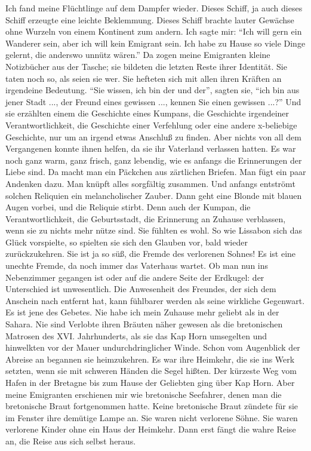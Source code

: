 \documentclass[12pt,ngerman,twocolumn]{article}
\begin{document}
Ich fand meine Flüchtlinge auf dem Dampfer wieder. Dieses Schiff, ja auch dieses Schiff erzeugte eine leichte Beklemmung. Dieses Schiff brachte lauter Gewächse ohne Wurzeln von einem Kontinent zum andern. Ich sagte mir: \enquote{Ich will gern ein Wanderer sein, aber ich will kein Emigrant sein. Ich habe zu Hause so viele Dinge gelernt, die anderswo unnütz wären.} Da zogen meine Emigranten kleine Notizbücher aus der Tasche; sie bildeten die letzten Reste ihrer Identität. Sie taten noch so, als seien sie wer. Sie hefteten sich mit allen ihren Kräften an irgendeine Bedeutung. \enquote{Sie wissen, ich bin der und der}, sagten sie, \enquote{ich bin aus jener Stadt ..., der Freund eines gewissen ..., kennen Sie einen gewissen ...?} Und sie erzählten einem die Geschichte eines Kumpans, die Geschichte irgendeiner Verantwortlichkeit, die Geschichte einer Verfehlung oder eine andere x-beliebige Geschichte, nur um an irgend etwas Anschluß zu finden. Aber nichts von all dem Vergangenen konnte ihnen helfen, da sie ihr Vaterland verlassen hatten. Es war noch ganz warm, ganz frisch, ganz lebendig, wie es anfangs die Erinnerungen der Liebe sind. Da macht man ein Päckchen aus zärtlichen Briefen. Man fügt ein paar Andenken dazu. Man knüpft alles sorgfältig zusammen. Und anfangs entströmt solchen Reliquien ein melancholischer Zauber. Dann geht eine Blonde mit blauen Augen vorbei, und die Reliquie stirbt. Denn auch der Kumpan, die Verantwortlichkeit, die Geburtsstadt, die Erinnerung an Zuhause verblassen, wenn sie zu nichts mehr nütze sind. Sie fühlten es wohl. So wie Lissabon sich das Glück vorspielte, so spielten sie sich den Glauben vor, bald wieder zurückzukehren. Sie ist ja so süß, die Fremde des verlorenen Sohnes! Es ist eine unechte Fremde, da noch immer das Vaterhaus wartet. Ob man nun ins Nebenzimmer gegangen ist oder auf die andere Seite der Erdkugel: der Unterschied ist unwesentlich. Die Anwesenheit des Freundes, der sich dem Anschein nach entfernt hat, kann fühlbarer werden als seine wirkliche Gegenwart. Es ist jene des Gebetes. Nie habe ich mein Zuhause mehr geliebt als in der Sahara. Nie sind Verlobte ihren Bräuten näher gewesen als die bretonischen Matrosen des XVI. Jahrhunderts, als sie das Kap Horn umsegelten und hinwelkten vor der Mauer undurchdringlicher Winde. Schon vom Augenblick der Abreise an begannen sie heimzukehren. Es war ihre Heimkehr, die sie ins Werk setzten, wenn sie mit schweren Händen die Segel hißten. Der kürzeste Weg vom Hafen in der Bretagne bis zum Hause der Geliebten ging über Kap Horn. Aber meine Emigranten erschienen mir wie bretonische Seefahrer, denen man die bretonische Braut fortgenommen hatte. Keine bretonische Braut zündete für sie im Fenster ihre demütige Lampe an. Sie waren nicht verlorene Söhne. Sie waren verlorene Kinder ohne ein Haus der Heimkehr. Dann erst fängt die wahre Reise an, die Reise aus sich selbst heraus.
\end{document}
